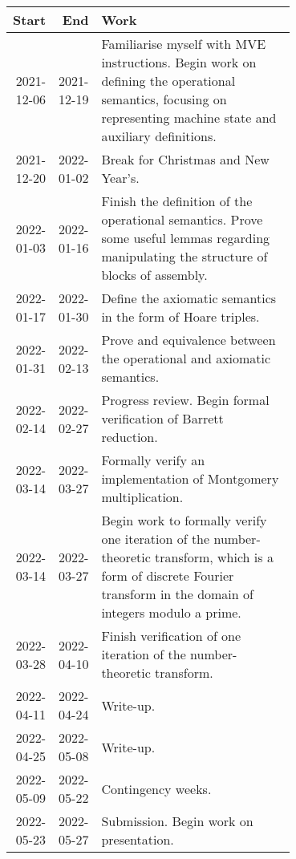 \documentclass[11pt]{article}
\begin{document}
\begin{center}
\begin{tabular}{rrp{0.7\linewidth}}
Start & End & Work\\
\hline
2021-12-06 & 2021-12-19 & Familiarise myself with MVE instructions. Begin work on defining the operational semantics, focusing on representing machine state and auxiliary definitions.\\
2021-12-20 & 2022-01-02 & Break for Christmas and New Year's.\\
2022-01-03 & 2022-01-16 & Finish the definition of the operational semantics. Prove some useful lemmas regarding manipulating the structure of blocks of assembly.\\
2022-01-17 & 2022-01-30 & Define the axiomatic semantics in the form of Hoare triples.\\
2022-01-31 & 2022-02-13 & Prove and equivalence between the operational and axiomatic semantics.\\
2022-02-14 & 2022-02-27 & Progress review. Begin formal verification of Barrett reduction.\\
2022-03-14 & 2022-03-27 & Formally verify an implementation of Montgomery multiplication.\\
2022-03-14 & 2022-03-27 & Begin work to formally verify one iteration of the number-theoretic transform, which is a form of discrete Fourier transform in the domain of integers modulo a prime.\\
2022-03-28 & 2022-04-10 & Finish verification of one iteration of the number-theoretic transform.\\
2022-04-11 & 2022-04-24 & Write-up.\\
2022-04-25 & 2022-05-08 & Write-up.\\
2022-05-09 & 2022-05-22 & Contingency weeks.\\
2022-05-23 & 2022-05-27 & Submission. Begin work on presentation.\\
\end{tabular}

\end{center}
\end{document}
